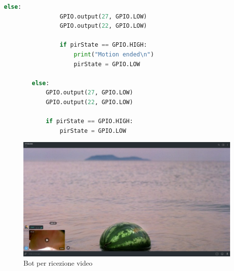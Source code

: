 \documentclass[12pt]{article}
\begin{document}
\begin{lstlisting}[language=Python]
        	else:
            	GPIO.output(27, GPIO.LOW)
            	GPIO.output(22, GPIO.LOW)

            	if pirState == GPIO.HIGH:
                	print("Motion ended\n")
                	pirState = GPIO.LOW

    	else:
        	GPIO.output(27, GPIO.LOW)
        	GPIO.output(22, GPIO.LOW)

        	if pirState == GPIO.HIGH:
            	pirState = GPIO.LOW
	\end{lstlisting}

	\begin{figure}[h]
		\centering
		\includegraphics[width=5.0in]{video}
		\caption{Bot per ricezione video} 
	\end{figure}
\end{document}
